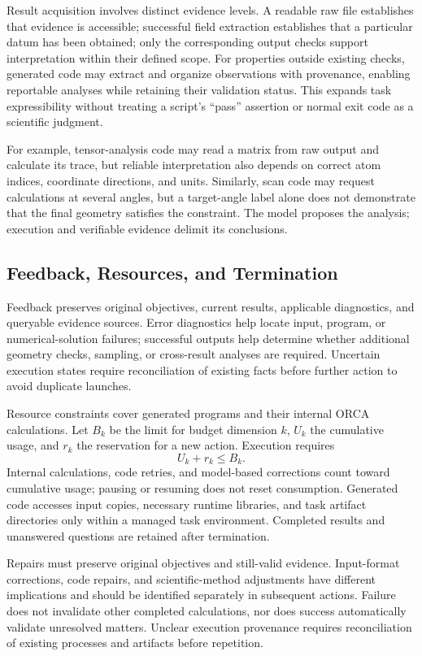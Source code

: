 \documentclass[a4paper,11pt]{article}
\begin{document}
Result acquisition involves distinct evidence levels.
A readable raw file establishes that evidence is accessible; successful field extraction establishes that a particular datum has been obtained; only the corresponding output checks support interpretation within their defined scope.
For properties outside existing checks, generated code may extract and organize observations with provenance, enabling reportable analyses while retaining their validation status.
This expands task expressibility without treating a script's ``pass'' assertion or normal exit code as a scientific judgment.

For example, tensor-analysis code may read a matrix from raw output and calculate its trace, but reliable interpretation also depends on correct atom indices, coordinate directions, and units.
Similarly, scan code may request calculations at several angles, but a target-angle label alone does not demonstrate that the final geometry satisfies the constraint.
The model proposes the analysis; execution and verifiable evidence delimit its conclusions.

\subsection{Feedback, Resources, and Termination}
Feedback preserves original objectives, current results, applicable diagnostics, and queryable evidence sources.
Error diagnostics help locate input, program, or numerical-solution failures; successful outputs help determine whether additional geometry checks, sampling, or cross-result analyses are required.
Uncertain execution states require reconciliation of existing facts before further action to avoid duplicate launches.

Resource constraints cover generated programs and their internal ORCA calculations.
Let $B_k$ be the limit for budget dimension $k$, $U_k$ the cumulative usage, and $r_k$ the reservation for a new action.
Execution requires
\begin{equation}
  U_k+r_k\leq B_k.
\end{equation}
Internal calculations, code retries, and model-based corrections count toward cumulative usage; pausing or resuming does not reset consumption.
Generated code accesses input copies, necessary runtime libraries, and task artifact directories only within a managed task environment.
Completed results and unanswered questions are retained after termination.

Repairs must preserve original objectives and still-valid evidence.
Input-format corrections, code repairs, and scientific-method adjustments have different implications and should be identified separately in subsequent actions.
Failure does not invalidate other completed calculations, nor does success automatically validate unresolved matters.
Unclear execution provenance requires reconciliation of existing processes and artifacts before repetition.
\end{document}

